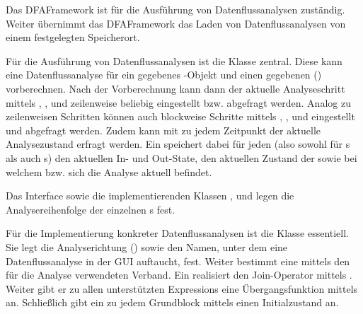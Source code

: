 
Das DFAFramework ist für die Ausführung von Datenflussanalysen zuständig.
Weiter übernimmt das DFAFramework das Laden von Datenflussanalysen von einem festgelegten Speicherort.

Für die Ausführung von Datenflussanalysen ist die Klasse  zentral.
Diese kann eine Datenflussanalyse für ein gegebenes -Objekt und einen gegebenen  () vorberechnen.
Nach der Vorberechnung kann dann der aktuelle Analyseschritt mittels , ,  und  zeilenweise beliebig eingestellt bzw. abgefragt werden. 
Analog zu zeilenweisen Schritten können auch blockweise Schritte mittels , ,  und  eingestellt und abgefragt werden.
Zudem kann mit  zu jedem Zeitpunkt der aktuelle Analysezustand erfragt werden.
Ein  speichert dabei für jeden  (also sowohl für s als auch s) den aktuellen In- und Out-State, den aktuellen Zustand der  sowie bei welchem  bzw.  sich die Analyse aktuell befindet.

Das Interface  sowie die implementierenden Klassen ,  und  legen die Analysereihenfolge der einzelnen s fest.

Für die Implementierung konkreter Datenflussanalysen ist die Klasse  essentiell.
Sie legt die Analyserichtung () sowie den Namen, unter dem eine Datenflussanalyse in der GUI auftaucht, fest.
Weiter bestimmt eine  mittels  den für die Analyse verwendeten Verband.
Ein  realisiert den Join-Operator mittels .
Weiter gibt er zu allen unterstützten Expressions eine Übergangsfunktion mittels  an.
Schließlich gibt ein  zu jedem Grundblock mittels  einen Initialzustand an.

